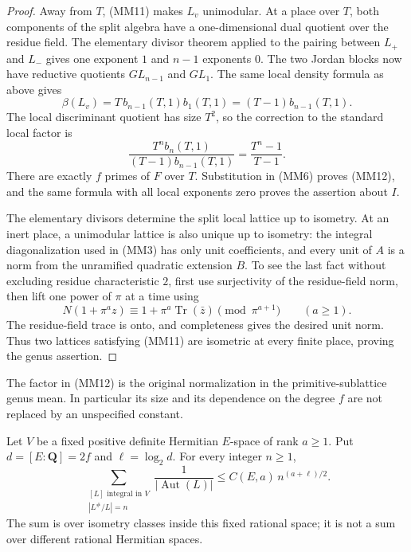 \begin{proof}
Away from \(T\), (MM11) makes \(L_v\) unimodular.  At a place over
\(T\), both components of the split algebra have a one-dimensional
dual quotient over the residue field.  The elementary divisor
theorem applied to the pairing between \(L_+\) and \(L_-\) gives
one exponent \(1\) and \(n-1\) exponents \(0\).  The two Jordan
blocks now have reductive quotients \(GL_{n-1}\) and \(GL_1\).
The same local density formula as above gives
\[
 \beta(L_v)=T\,b_{n-1}(T,1)b_1(T,1)
                         =(T-1)b_{n-1}(T,1).
\]
The local discriminant quotient has size \(T^2\), so the
correction to the standard local factor is
\[
 \frac{T^n b_n(T,1)}
             {(T-1)b_{n-1}(T,1)}
                         =\frac{T^n-1}{T-1}.
\]
There are exactly \(f\) primes of \(F\) over \(T\).  Substitution
in (MM6) proves (MM12), and the same formula with all local
exponents zero proves the assertion about \(I\).

The elementary divisors determine the split local lattice up to
isometry.  At an inert place, a unimodular lattice is also unique
up to isometry: the integral diagonalization used in (MM3) has
only unit coefficients, and every unit of \(A\) is a norm from
the unramified quadratic extension \(B\).  To see the last fact
without excluding residue characteristic \(2\), first use
surjectivity of the residue-field norm, then lift one power of
\(\pi\) at a time using
\[
 N(1+\pi^a z)\equiv
          1+\pi^a\operatorname{Tr}(\bar z)\pmod{\pi^{a+1}}
                    \qquad(a\geq1).
\]
The residue-field trace is onto, and completeness gives the
desired unit norm.  Thus two lattices satisfying (MM11) are
isometric at every finite place, proving the genus assertion.
\end{proof}

The factor in (MM12) is the original normalization in the
primitive-sublattice genus mean.  In particular its size and its
dependence on the degree \(f\) are not replaced by an unspecified
constant.\cite{maximal-hermitian-mass-source}

\begin{theorem}
\label{thm:integral-lattice-fixed-discriminant-mass}
Let \(V\) be a fixed positive definite Hermitian \(E\)-space of
rank \(a\geq1\).  Put \(d=[E:\mathbf Q]=2f\) and
\(\ell=\log_2d\).  For every integer \(n\geq1\),
\[
 \sum_{\substack{[L]\text{ integral in }V\\ |L^\#/L|=n}}
                   \frac1{|\operatorname{Aut}(L)|}
          \leq C(E,a)\,n^{(a+\ell)/2}.
 \tag{MM13}
\]
The sum is over isometry classes inside this fixed rational space;
it is not a sum over different rational Hermitian spaces.
\end{theorem}

